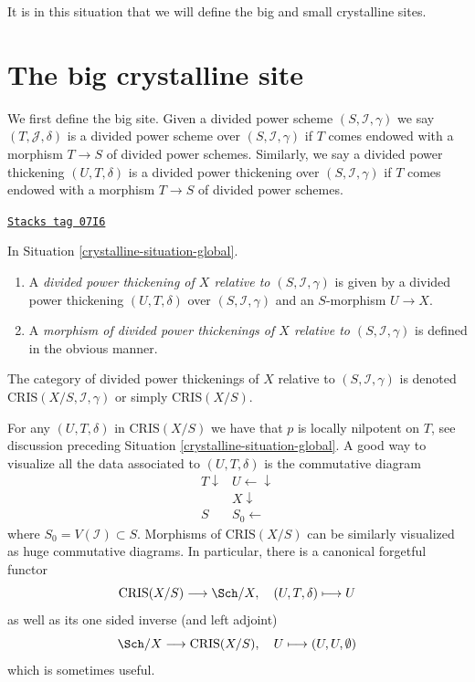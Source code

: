 It is in this situation that we will define the big and small
crystalline sites.

\section{The big crystalline site}
\label{crystalline-section-big-site}
We first define the big site. Given a divided power scheme
$(S, \mathcal{I}, \gamma)$ we say $(T, \mathcal{J}, \delta)$ is
a divided power scheme over $(S, \mathcal{I}, \gamma)$ if
$T$ comes endowed with a morphism $T \to S$ of divided power
schemes. Similarly, we say a divided power thickening $(U, T, \delta)$
is a divided power thickening over $(S, \mathcal{I}, \gamma)$
if $T$ comes endowed with a morphism $T \to S$ of divided power
schemes.

\begin{definition}
\label{crystalline-definition-divided-power-thickening-X}
\href{https://stacks.math.columbia.edu/tag/07I6}{\texttt{Stacks tag 07I6}}

In Situation \ref{crystalline-situation-global}.
\begin{enumerate}
\item A {\it divided power thickening of $X$ relative to
$(S, \mathcal{I}, \gamma)$} is given by a divided power thickening
$(U, T, \delta)$ over $(S, \mathcal{I}, \gamma)$
and an $S$-morphism $U \to X$.
\item A {\it morphism of divided power thickenings of $X$
relative to $(S, \mathcal{I}, \gamma)$} is defined in the obvious
manner.
\end{enumerate}
The category of divided power thickenings of $X$ relative to
$(S, \mathcal{I}, \gamma)$ is denoted $\text{CRIS}(X/S, \mathcal{I}, \gamma)$
or simply $\text{CRIS}(X/S)$.
\end{definition}

For any $(U, T, \delta)$ in $\text{CRIS}(X/S)$
we have that $p$ is locally nilpotent on $T$, see discussion preceding
Situation \ref{crystalline-situation-global}.
A good way to visualize all the data associated to $(U, T, \delta)$
is the commutative diagram
$$
\begin{array}{cc}T \downarrow & U \longleftarrow\downarrow \\  & X \downarrow \\ S & S_0 \longleftarrow\end{array}
$$
where $S_0 = V(\mathcal{I}) \subset S$. Morphisms of $\text{CRIS}(X/S)$
can be similarly visualized as huge commutative diagrams. In particular,
there is a canonical forgetful functor
\begin{equation}
\label{equation-forget}
\text{CRIS}(X/S) \longrightarrow \Sch/X,\quad
(U, T, \delta) \longmapsto U
\end{equation}
as well as its one sided inverse (and left adjoint)
\begin{equation}
\label{equation-endow-trivial}
\Sch/X \longrightarrow \text{CRIS}(X/S),\quad
U \longmapsto (U, U, \emptyset)
\end{equation}
which is sometimes useful.

